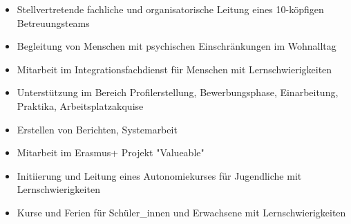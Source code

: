\documentclass[10pt,a4paper]{altacv}
\begin{document}
     \begin{itemize}
       \item {Stellvertretende fachliche und organisatorische Leitung eines 10-köpfigen Betreuungsteams}
       \item {Begleitung von Menschen mit psychischen Einschränkungen im Wohnalltag}
     \end{itemize}
  \divider

  \divider

  \divider

  \divider

  \newpage


  \begin{itemize}
    \item{Mitarbeit im Integrationsfachdienst für Menschen mit Lernschwierigkeiten}
    \item{Unterstützung im Bereich Profilerstellung, Bewerbungsphase, Einarbeitung, Praktika, Arbeitsplatzakquise}
    \item {Erstellen von Berichten, Systemarbeit}
    \item {Mitarbeit im Erasmus+ Projekt "Valueable"}
  \end{itemize}
  \divider

  \begin{itemize}
    \item{Initiierung und Leitung eines Autonomiekurses für Jugendliche mit Lernschwierigkeiten}
    \item {Kurse und Ferien für Schüler\_innen und Erwachsene mit Lernschwierigkeiten}
  \end{itemize}
  \divider
\end{document}

